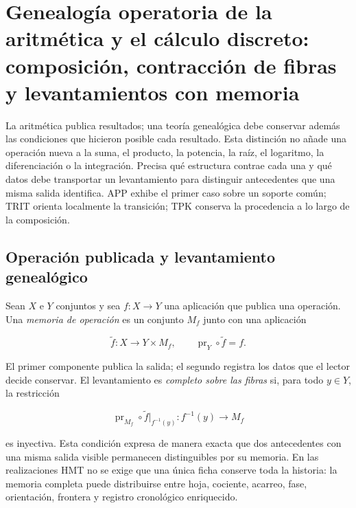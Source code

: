 
\chapter[Aritmética, cálculo discreto y memoria genealógica]{Genealogía
operatoria de la aritmética y el cálculo discreto: composición, contracción
de fibras y levantamientos con memoria}
\label{chap:genealogia-operaciones-rev2}

La aritmética publica resultados; una teoría genealógica debe conservar
además las condiciones que hicieron posible cada resultado. Esta distinción
no añade una operación nueva a la suma, el producto, la potencia, la raíz, el
logaritmo, la diferenciación o la integración. Precisa qué estructura
contrae cada una y qué datos debe transportar un levantamiento para distinguir
antecedentes que una misma salida identifica. APP exhibe el primer caso sobre
un soporte común; TRIT orienta localmente la transición; TPK conserva la
procedencia a lo largo de la composición.

\section{Operación publicada y levantamiento genealógico}

Sean \(X\) e \(Y\) conjuntos y sea \(f:X\to Y\) una aplicación que publica
una operación. Una \emph{memoria de operación} es un conjunto \(M_f\) junto
con una aplicación

\begin{equation}
 \widetilde f:X\longrightarrow Y\times M_f,
 \qquad
 \operatorname{pr}_Y\circ\widetilde f=f.
 \label{eq:levantamiento-genealogico-operacion-rev2}
\end{equation}

El primer componente publica la salida; el segundo registra los datos que el
lector decide conservar. El levantamiento es \emph{completo sobre las fibras}
si, para todo \(y\in Y\), la restricción

\[
 \operatorname{pr}_{M_f}\circ\widetilde f\big|_{f^{-1}(y)}
 :f^{-1}(y)\longrightarrow M_f
\]

es inyectiva. Esta condición expresa de manera exacta que dos antecedentes
con una misma salida visible permanecen distinguibles por su memoria. En las
realizaciones HMT no se exige que una única ficha conserve toda la historia:
la memoria completa puede distribuirse entre hoja, cociente, acarreo, fase,
orientación, frontera y registro cronológico enriquecido.


